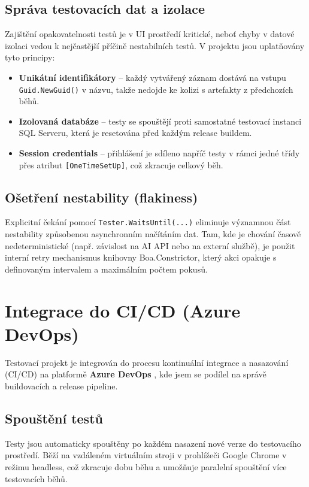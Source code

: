 \subsection{Správa testovacích dat a izolace}

Zajištění opakovatelnosti testů je v UI prostředí kritické, neboť chyby v datové izolaci vedou k nejčastější příčině nestabilních testů. V projektu jsou uplatňovány tyto principy:
\begin{itemize}
    \item \textbf{Unikátní identifikátory} -- každý vytvářený záznam dostává na vstupu \texttt{Guid.NewGuid()} v názvu, takže nedojde ke kolizi s artefakty z předchozích běhů.
    \item \textbf{Izolovaná databáze} -- testy se spouštějí proti samostatné testovací instanci SQL Serveru, která je resetována před každým release buildem.
    \item \textbf{Session credentials} -- přihlášení je sdíleno napříč testy v rámci jedné třídy přes atribut \texttt{[OneTimeSetUp]}, což zkracuje celkový běh.
\end{itemize}

\subsection{Ošetření nestability (flakiness)}

Explicitní čekání pomocí \texttt{Tester.WaitsUntil(...)} eliminuje významnou část nestability způsobenou asynchronním načítáním dat. Tam, kde je chování časově nedeterministické (např. závislost na AI API nebo na externí službě), je použit interní retry mechanismus knihovny Boa.Constrictor, který akci opakuje s definovaným intervalem a maximálním počtem pokusů.

\section{Integrace do CI/CD (Azure DevOps)}

Testovací projekt je integrován do procesu kontinuální integrace a nasazování (CI/CD) na platformě \textbf{Azure DevOps} \cite{azure_devops_docs}, kde jsem se podílel na správě buildovacích a release pipeline.

\subsection{Spouštění testů}
Testy jsou automaticky spouštěny po každém nasazení nové verze do testovacího prostředí. Běží na vzdáleném virtuálním stroji v prohlížeči Google Chrome v režimu headless, což zkracuje dobu běhu a umožňuje paralelní spouštění více testovacích běhů.

